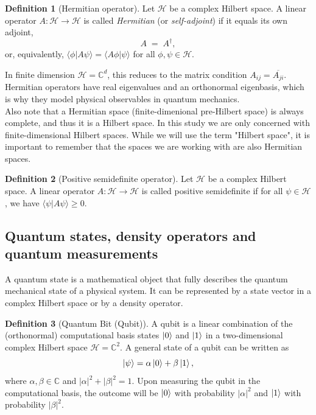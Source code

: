 \documentclass[oneside, a4paper, onecolumn, 11pt]{article}
\theoremstyle{definition}
\newtheorem{definition}{Definition}[section]
\theoremstyle{plain}
\theoremstyle{remark}
\begin{document}
\begin{definition}[Hermitian operator]
\label{def:hermitian}
Let $\mathcal{H}$ be a complex Hilbert space. A linear operator
$A : \mathcal{H} \to \mathcal{H}$ is called \emph{Hermitian} (or
\emph{self-adjoint}) if it equals its own adjoint,
\begin{equation}
  A \;=\; A^{\dagger},
  \label{eq:hermitian}
\end{equation}
or, equivalently,
$\langle \phi | A\psi \rangle = \langle A\phi | \psi \rangle$
for all $\phi, \psi \in \mathcal{H}$.
\end{definition}
In finite dimension $\mathcal{H} = \mathbb{C}^{d}$, this reduces to the matrix
condition $A_{ij} = \overline{A_{ji}}$. Hermitian operators have real
eigenvalues and an orthonormal eigenbasis, which is why they model
physical observables in quantum mechanics.
\\ Also note that a Hermitian space (finite-dimenional pre-Hilbert space) is always complete, and thus it is a Hilbert space.
In this study we are only concerned with finite-dimensional Hilbert spaces. While we will use the term "Hilbert space", it is important to remember that 
the spaces we are working with are also Hermitian spaces.

\begin{definition}[Positive semidefinite operator]
  Let $\mathcal{H}$ be a complex Hilbert space. A linear operator $A : \mathcal{H} \to \mathcal{H}$ is called positive semidefinite if for all $\psi \in \mathcal{H}$, we have $\langle \psi | A\psi \rangle \geq 0$.
\end{definition}


\subsection{Quantum states, density operators and quantum measurements}
A quantum state is a mathematical object that fully describes the quantum
mechanical state of a physical system. It can be represented by a state vector in a complex Hilbert space or by
a density operator.
\begin{definition}[Quantum Bit (Qubit)]
  A qubit is a linear combination of the (orthonormal) computational basis states $\ket{0}$ and $\ket{1}$ in a two-dimensional complex Hilbert space $\mathcal{H} = \mathbb{C}^2$. A general state of a qubit can be written as
  \begin{equation}
    \ket{\psi} = \alpha \ket{0} + \beta \ket{1},
  \end{equation}
  where $\alpha, \beta \in \mathbb{C}$ and $|\alpha|^2 + |\beta|^2 = 1$.
  Upon measuring the qubit in the computational basis, the outcome will be $\ket{0}$ with probability $|\alpha|^2$ and $\ket{1}$ with probability $|\beta|^2$.


\end{definition}
\end{document}

